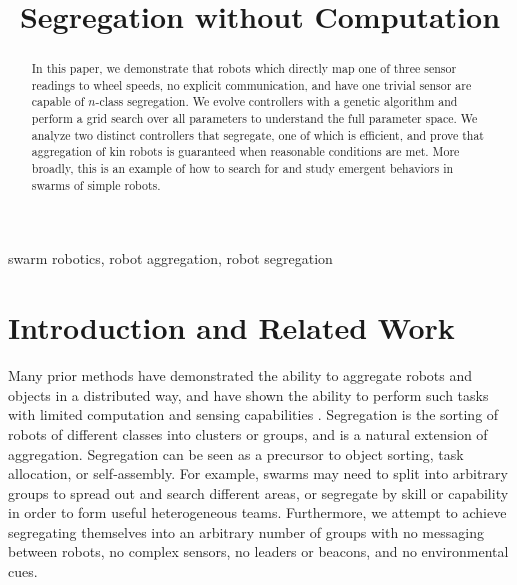 \documentclass[conference]{IEEEtran}
\begin{document}
\title{Segregation without Computation}

\author{
}

\maketitle

\begin{abstract}
  In this paper, we demonstrate that robots which directly map one of three sensor readings to wheel speeds, no explicit communication, and have one trivial sensor are capable of $n$-class segregation. We evolve controllers with a genetic algorithm and perform a grid search over all parameters to understand the full parameter space. We analyze two distinct controllers that segregate, one of which is efficient, and prove that aggregation of kin robots is guaranteed when reasonable conditions are met. More broadly, this is an example of how to search for and study emergent behaviors in swarms of simple robots.
\end{abstract}

\begin{IEEEkeywords}
  swarm robotics, robot aggregation, robot segregation
\end{IEEEkeywords}

\section{Introduction and Related Work}

  Many prior methods have demonstrated the ability to aggregate robots and objects in a distributed way\cite{shlyakhov_survey_2017}, and \cite{gauci_self-organized_2014}\cite{gauci_clustering_2014} have shown the ability to perform such tasks with limited computation and sensing capabilities . Segregation is the sorting of robots of different classes into clusters or groups, and is a natural extension of aggregation. Segregation can be seen as a precursor to object sorting, task allocation, or self-assembly. For example, swarms may need to split into arbitrary groups to spread out and search different areas, or segregate by skill or capability in order to form useful heterogeneous teams. Furthermore, we attempt to achieve segregating themselves into an arbitrary number of groups with no messaging between robots, no complex sensors, no leaders or beacons, and no environmental cues.
\end{document}
